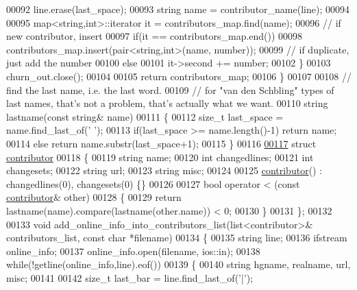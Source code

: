 \begin{DoxyCode}
00092     line.erase(last\_space);    
00093     \textcolor{keywordtype}{string} name = contributor\_name(line);
00094     
00095     map<string,int>::iterator it = contributors\_map.find(name);
00096     \textcolor{comment}{// if new contributor, insert}
00097     \textcolor{keywordflow}{if}(it == contributors\_map.end())
00098       contributors\_map.insert(pair<string,int>(name, number));
00099     \textcolor{comment}{// if duplicate, just add the number}
00100     \textcolor{keywordflow}{else}
00101       it->second += number;
00102   \}
00103   churn\_out.close();
00104 
00105   \textcolor{keywordflow}{return} contributors\_map;
00106 \}
00107 
00108 \textcolor{comment}{// find the last name, i.e. the last word.}
00109 \textcolor{comment}{// for "van den Schbling" types of last names, that's not a problem, that's actually what we want.}
00110 \textcolor{keywordtype}{string} lastname(\textcolor{keyword}{const} \textcolor{keywordtype}{string}& name)
00111 \{
00112   \textcolor{keywordtype}{size\_t} last\_space = name.find\_last\_of(\textcolor{charliteral}{' '});
00113   \textcolor{keywordflow}{if}(last\_space >= name.length()-1) \textcolor{keywordflow}{return} name;
00114   \textcolor{keywordflow}{else} \textcolor{keywordflow}{return} name.substr(last\_space+1);
00115 \}
00116 
\hyperlink{structcontributor}{00117} \textcolor{keyword}{struct }\hyperlink{structcontributor}{contributor}
00118 \{
00119   \textcolor{keywordtype}{string} name;
00120   \textcolor{keywordtype}{int} changedlines;
00121   \textcolor{keywordtype}{int} changesets;
00122   \textcolor{keywordtype}{string} url;
00123   \textcolor{keywordtype}{string} misc;
00124   
00125   \hyperlink{structcontributor}{contributor}() : changedlines(0), changesets(0) \{\}
00126   
00127   \textcolor{keywordtype}{bool} operator < (\textcolor{keyword}{const} \hyperlink{structcontributor}{contributor}& other)
00128   \{
00129     \textcolor{keywordflow}{return} lastname(name).compare(lastname(other.name)) < 0;
00130   \}
00131 \};
00132 
00133 \textcolor{keywordtype}{void} add\_online\_info\_into\_contributors\_list(list<contributor>& contributors\_list, \textcolor{keyword}{const} \textcolor{keywordtype}{char} *filename)
00134 \{
00135   \textcolor{keywordtype}{string} line;
00136   ifstream online\_info;
00137   online\_info.open(filename, ios::in);
00138   \textcolor{keywordflow}{while}(!getline(online\_info,line).eof())
00139   \{
00140     \textcolor{keywordtype}{string} hgname, realname, url, misc;
00141     
00142     \textcolor{keywordtype}{size\_t} last\_bar = line.find\_last\_of(\textcolor{charliteral}{'|'});

\end{DoxyCode}
